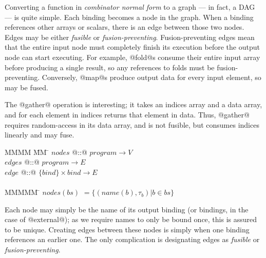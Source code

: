Converting a function in \emph{combinator normal form} to a graph --- in fact, a DAG --- is quite simple.
Each binding becomes a node in the graph. When a binding references other arrays or scalars, there is an edge between those two nodes. Edges may be either \emph{fusible} or \emph{fusion-preventing}. Fusion-preventing edges mean that the entire input node must completely finish its execution before the output node can start executing. For example, @fold@s consume their entire input array before producing a single result, so any references to folds must be fusion-preventing. Conversely, @map@s produce output data for every input element, so may be fused.

The @gather@ operation is interesting; it takes an indices array and a data array, and for each element in indices returns that element in data.
Thus, @gather@ requires random-access in its data array, and is not fusible, but consumes indices linearly and may fuse.

\begin{tabbing}
MMMM        \= MM   \= \kill
$nodes$     \> @::@ \> $program \to V$          \\
$edges$     \> @::@ \> $program \to E$          \\
$edge$      \> @::@ \> $\{bind\} \times bind \to E$\\
\\
MMMMM       \= \kill
$nodes(bs)$ \> $= \{(name(b), \tau_b) | b \in bs\}$       \\
\end{tabbing}
Each node may simply be the name of its output binding (or bindings, in the case of @external@); as we require names to only be bound once, this is assured to be unique.
Creating edges between these nodes is simply when one binding references an earlier one. The only complication is designating edges as \emph{fusible} or \emph{fusion-preventing}.


